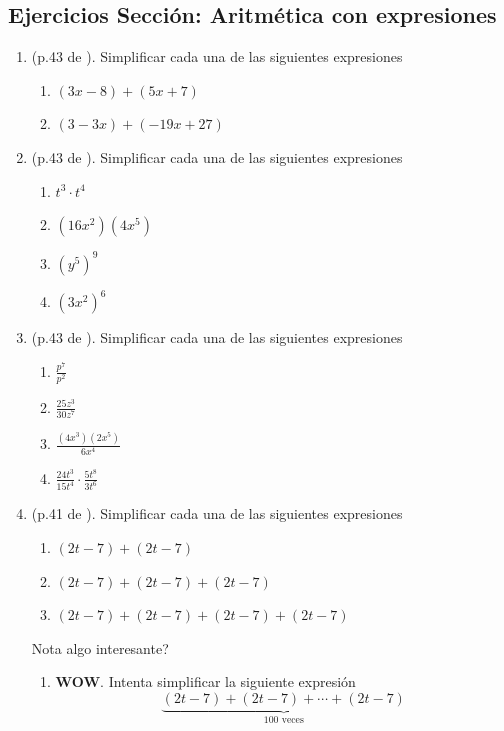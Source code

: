 \newpage
\begin{center}
	\vspace{-1cm}
	\subsection{ Ejercicios Sección: Aritmética con expresiones}
\end{center}	
\begin{enumerate}
	\item (p.43 de \cite{Aops_algebra}). Simplificar cada una de las siguientes expresiones
	\begin{multicols}{2}
		\begin{enumerate}[label=\Alph*)]
			\item $(3x-8) + (5x+7)$
			\item $(3-3x)+(-19x+27)$
		\end{enumerate}
	\end{multicols}
	\item (p.43 de \cite{Aops_algebra}). Simplificar cada una de las siguientes expresiones
	\begin{multicols}{2}
		\begin{enumerate}[label=\Alph*)]
			\item $t^3\cdot t^4$
			\item $(16x^2)(4x^5)$
			\item ${(y^5)}^9$
			\item ${(3x^2)}^6$
		\end{enumerate}
	\end{multicols}
	\item (p.43 de \cite{Aops_algebra}). Simplificar cada una de las siguientes expresiones
	\begin{multicols}{2}
		\begin{enumerate}[label=\Alph*)]
			\item $\frac{p^7}{p^2}$
			\item $\frac{25z^3}{30z^7}$
			\item $\frac{(4x^3)(2x^5)}{6x^4}$
			\item $\frac{24t^3}{15t^4} \cdot \frac{5t^8}{3t^6}$
		\end{enumerate}
	\end{multicols} 		
	
	\item (p.41 de \cite{Aops_algebra}). Simplificar cada una de las siguientes expresiones
	\begin{enumerate}[label=\Alph*)]
		\item $(2t-7) + (2t-7)$							
		\item $(2t-7) + (2t-7) + (2t-7)$
		\item $(2t-7) + (2t-7) + (2t-7)+ (2t-7)$	
	\end{enumerate}
	Nota algo interesante?
	\begin{enumerate}[resume,label=\Alph*)]
		\item \textbf{WOW}. Intenta simplificar la siguiente expresión
		\[\underbrace{(2t-7) + (2t-7) +\cdots +(2t-7)}_{\text{100 veces}}\]
	\end{enumerate}
	

\end{enumerate}
